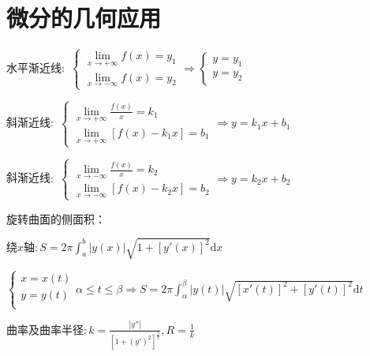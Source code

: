 \section{微分的几何应用}

\begin{spacing}{\hangju}
    \noindent 水平渐近线$\colon$
        $\left\{\begin{aligned}
            \lim\limits_{x \to +\infty}{f(x)} = y_{1} \\
            \lim\limits_{x \to -\infty}{f(x)} = y_{2}
        \end{aligned}\right.
        \Rightarrow
        \left\{\begin{aligned}
            y = y_{1} \\
            y = y_{2}
        \end{aligned}\right.$

    \noindent 斜渐近线$\colon$
        $\begin{cases}
            \lim\limits_{x \to +\infty}{\frac{f(x)}{x}} = k_{1} \\
            \lim\limits_{x \to +\infty}{[f(x) - k_{1}x]} = b_{1}
        \end{cases}
        \Rightarrow y = k_{1}x + b_{1}$

    \noindent 斜渐近线$\colon$
    $\begin{cases}
        \lim\limits_{x \to -\infty}{\frac{f(x)}{x}} = k_{2} \\
        \lim\limits_{x \to -\infty}{[f(x) - k_{2}x]} = b_{2}
    \end{cases}
    \Rightarrow y = k_{2}x + b_{2}$

    \noindent 旋转曲面的侧面积：

    $\mbox{绕}x\mbox{轴}\colon S = 2 \pi \int_{a}^{b}{|y(x)|\sqrt{1 + [y'(x)]^2}\mathrm{d}x}$

    \noindent $\left\{\begin{array}{l}
        x = x(t)\\
        y = y(t)\\
    \end{array}\right. \alpha \le t \le \beta \Rightarrow S = 2\pi\int_{\alpha}^{\beta}{|y(t)|\sqrt{[x'(t)]^2 + [y'(t)]^2}\mathrm{d}t}$

    \noindent $\mbox{曲率及曲率半径}\colon k = \frac{|y''|}{[1 + (y')^2]^{\frac{3}{2}}}, R = \frac{1}{k}$
\end{spacing}
